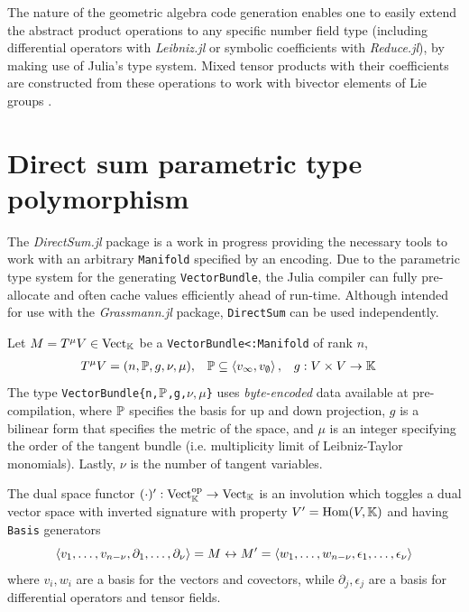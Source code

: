 \documentclass{juliacon}
\begin{document}
The nature of the geometric algebra code generation enables one to easily extend the abstract product operations to any specific number field type (including differential operators with \textit{Leibniz.jl} or symbolic coefficients with \textit{Reduce.jl}), by making use of Julia's type system. Mixed tensor products with their coefficients are constructed from these operations to work with bivector elements of Lie groups \cite{hestenes}\cite{shahshahani}.

\section{Direct sum parametric type polymorphism}

The \textit{DirectSum.jl} package is a work in progress providing the necessary tools to work with an arbitrary \verb`Manifold` specified by an encoding. Due to the parametric type system for the generating \verb`VectorBundle`, the Julia compiler can fully pre-allocate and often cache values efficiently ahead of run-time.
Although intended for use with the \textit{Grassmann.jl} package, \verb`DirectSum` can be used independently.

\begin{definition}
	Let $M = T^\mu V\in\text{Vect}_{\mathbb{K}}$ be a \verb`VectorBundle<:Manifold` of rank $n$,
	\begin{align*}
		T^\mu V &= (n,\mathbb{P},g,\nu,\mu), & \mathbb{P} &\subseteq\left\langle v_\infty,v_\emptyset \right\rangle, & g &:V\times V\rightarrow\mathbb{K}
	\end{align*}
	The type \verb+VectorBundle{n,+$\mathbb{P}$\verb+,g,+$\nu,\mu$\verb+}+ uses \textit{byte-encoded} data available at pre-compilation, where
	$\mathbb{P}$ specifies the basis for up and down projection,
	$g$ is a bilinear form that specifies the metric of the space,
	and $\mu$ is an integer specifying the order of the tangent bundle (i.e. multiplicity limit of Leibniz-Taylor monomials). Lastly, $\nu$ is the number of tangent variables.
\end{definition}
The dual space functor $(\cdot)':\text{Vect}_{\mathbb{K}}^\text{op}\rightarrow\text{Vect}_{\mathbb{K}}$
is an involution which toggles a dual vector space with inverted signature with property $V' = \text{Hom}(V,\mathbb{K})$ and having \verb`Basis` generators
$$\left\langle v_1,\dots,v_{n-\nu},\partial_1,\dots,\partial_\nu \right\rangle=M\leftrightarrow M' = \left\langle w_1,\dots,w_{n-\nu},\epsilon_1,\dots,\epsilon_\nu \right\rangle$$
where $v_i,w_i$ are a basis for the vectors and covectors, while $\partial_j,\epsilon_j$ are a basis for differential operators and tensor fields.
\end{document}

